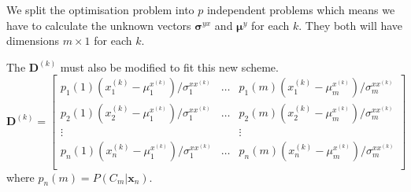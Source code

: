 We split the optimisation problem into $p$ independent problems which means we have to calculate the unknown vectors $\boldsymbol{\sigma}^{yx}$ and $\boldsymbol{\mu}^{y}$ for each $k$. They both will have dimensions $m\times 1$ for each $k$.

The $\mathbf{D}^{(k)}$ must also be modified to fit this new scheme.
\begin{equation}
	\label{eq:D_matrix_new}
	\mathbf{D}^{(k)} = \begin{bmatrix}
		p_1(1)(x_1^{(k)} - \mu_1^{x^{(k)}})/\sigma_1^{xx^{(k)}} & \dots & p_1(m)(x_1^{(k)} - \mu_m^{x^{(k)}})/\sigma_m^{xx^{(k)}} \\
		p_2(1)(x_2^{(k)} - \mu_1^{x^{(k)}})/\sigma_1^{xx^{(k)}} & \dots & p_2(m)(x_2^{(k)} - \mu_m^{x^{(k)}})/\sigma_m^{xx^{(k)}} \\
		\vdots & & \vdots \\
		p_n(1)(x_n^{(k)} - \mu_1^{x^{(k)}})/\sigma_1^{xx^{(k)}} & \dots & p_n(m)(x_n^{(k)} - \mu_m^{x^{(k)}})/\sigma_m^{xx^{(k)}} \\
	\end{bmatrix}
\end{equation}
where $p_n(m)=P(C_m\vert \mathbf{x}_n)$.

